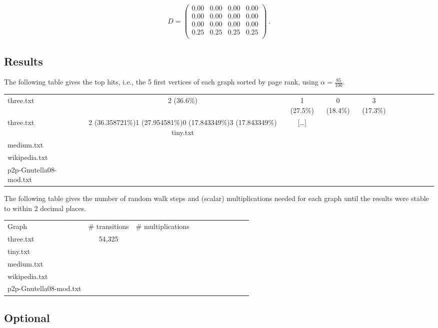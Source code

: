 \documentclass{tufte-handout}
\begin{document}
\begin{equation*}
D =
\left(
\begin{array}{cccc}
0.00 & 0.00 & 0.00 & 0.00 \\
0.00 & 0.00 & 0.00 & 0.00 \\
0.00 & 0.00 & 0.00 & 0.00 \\
0.25 & 0.25 & 0.25 & 0.25 \\
\end{array}
\right)\,.
\end{equation*}

\subsection{Results}

The following table gives the top hits, i.e., the 5 first vertices of
each graph sorted by page rank, using $\alpha = \frac{85}{100}$.



\medskip
\begin{fullwidth}
\small
\begin{tabular}{lcccccccccc}
three.txt & 2 (36.6\%) & 1 (27.5\%) & 0 (18.4\%) & 3 (17.3\%) \\
three.txt & 2 (36.358721\%)1 (27.954581\%)0 (17.843349\%)3 (17.843349\%)
tiny.txt & [\ldots] &\\
medium.txt &\\
wikipedia.txt & \\
p2p-Gnutella08-mod.txt &
\end{tabular}
\end{fullwidth}

\bigskip The following table gives the number of random walk steps and
(scalar) multiplications needed for each graph until the results were
stable to within 2 decimal places.

\medskip
\begin{fullwidth}
\small
\begin{tabular}{lcccccccccc}
Graph & \# transitions  & \# multiplications \\
three.txt & 54,325 \\
tiny.txt &\\
medium.txt &\\
wikipedia.txt & \\
p2p-Gnutella08-mod.txt
\end{tabular}
\end{fullwidth}

\subsection{Optional}
\end{document}
